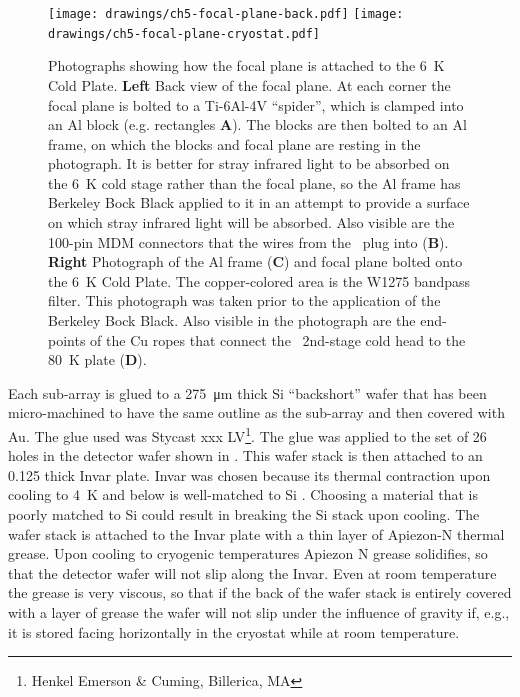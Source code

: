 \begin{figure}
\centering
\texttt{[image: drawings/ch5-focal-plane-back.pdf]}
\texttt{[image: drawings/ch5-focal-plane-cryostat.pdf]}
\caption[Photograph of focal plane in cryostat]{
  Photographs showing how the focal plane is attached to the \SI{6}{\K} Cold Plate.
  \textbf{Left}
  Back view of the focal plane.
  At each corner the focal plane is bolted to a Ti-6Al-4V ``spider'', which is clamped into an Al block (e.g. rectangles \textbf{A}).
  The blocks are then bolted to an Al frame, on which the blocks and focal plane are resting in the photograph.
  It is better for stray infrared light to be absorbed on the \SI{6}{\K} cold stage rather than the focal plane, so the Al frame has Berkeley Bock Black \cite{persky_review_1999} applied to it in an attempt to provide a surface on which stray infrared light will be absorbed.
  Also visible are the 100-pin MDM connectors that the wires from the \MCE\ plug into (\textbf{B}).
  \textbf{Right}
  Photograph of the Al frame (\textbf{C}) and focal plane bolted onto the \SI{6}{\K} Cold Plate.
  The copper-colored area is the W1275 bandpass filter.
  This photograph was taken prior to the application of the Berkeley Bock Black.
  Also visible in the photograph are the end-points of the Cu ropes that connect the \PTC\ 2nd-stage cold head to the \SI{80}{\K} plate (\textbf{D}).
}
\label{fig:ch5-focal-plane-back}
\end{figure}

Each sub-array is glued to a \SI{275}{\um} thick Si ``backshort'' wafer that has been micro-machined to have the same outline as the sub-array and then covered with Au.
The glue used was Stycast xxx LV\footnote{Henkel Emerson \& Cuming, Billerica, MA}.
The glue was applied to the set of 26 holes in the detector wafer shown in .
This wafer stack is then attached to an \SI{0.125}{\in} thick Invar plate.
Invar was chosen because its thermal contraction upon cooling to \SI{4}{\K} and below is well-matched to Si \cite{ekin_experimental_2006}.
Choosing a material that is poorly matched to Si could result in breaking the Si stack upon cooling.
The wafer stack is attached to the Invar plate with a thin layer of Apiezon-N thermal grease.
Upon cooling to cryogenic temperatures Apiezon N grease solidifies, so that the detector wafer will not slip along the Invar.
Even at room temperature the grease is very viscous, so that if the back of the wafer stack is entirely covered with a layer of grease the wafer will not slip under the influence of gravity if, e.g., it is stored facing horizontally in the cryostat while at room temperature.


